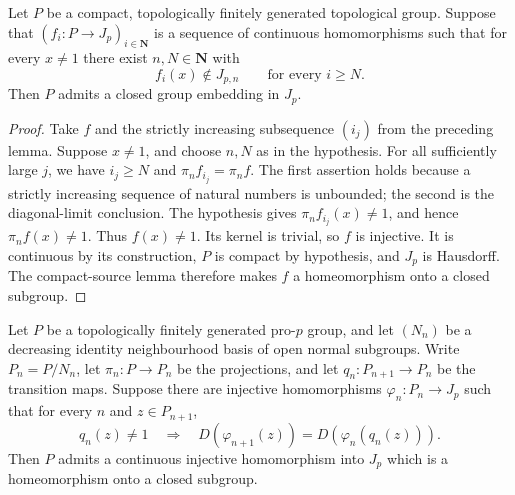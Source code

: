 \begin{lemma}
\label{lem:nottingham-depth-controlled-limit-embedding}
\leanok
Let $P$ be a compact, topologically finitely generated topological
group. Suppose that $(f_i:P\to J_p)_{i\in\mathbf N}$ is a sequence
of continuous homomorphisms such that for every $x\ne1$ there
exist $n,N\in\mathbf N$ with
\[
 f_i(x)\notin J_{p,n}\qquad\text{for every }i\ge N.
\]
Then $P$ admits a closed group embedding in $J_p$.
\end{lemma}

\begin{proof}
Take $f$ and the strictly increasing subsequence $(i_j)$ from
the preceding lemma. Suppose $x\ne1$, and choose $n,N$ as in
the hypothesis. For all sufficiently large $j$, we have
$i_j\ge N$ and $\pi_nf_{i_j}=\pi_nf$. The first assertion holds
because a strictly increasing sequence of natural numbers is
unbounded; the second is the diagonal-limit conclusion.
The hypothesis gives $\pi_nf_{i_j}(x)\ne1$, and hence
$\pi_nf(x)\ne1$. Thus $f(x)\ne1$. Its kernel is trivial, so
$f$ is injective. It is continuous by its construction, $P$ is
compact by hypothesis, and $J_p$ is Hausdorff. The compact-source
lemma therefore makes $f$ a homeomorphism onto a closed subgroup.
\end{proof}

\begin{lemma}
\label{lem:nottingham-embedding-of-quotient-depths}
\leanok
Let $P$ be a topologically finitely generated pro-$p$ group, and
let $(N_n)$ be a decreasing identity neighbourhood basis of open
normal subgroups. Write $P_n=P/N_n$, let $\pi_n:P\to P_n$ be
the projections, and let $q_n:P_{n+1}\to P_n$ be the transition maps.
Suppose there are injective homomorphisms $\varphi_n:P_n\to J_p$
such that for every $n$ and $z\in P_{n+1}$,
\[
 q_n(z)\ne1\quad\Longrightarrow\quad
 D(\varphi_{n+1}(z))=D(\varphi_n(q_n(z))).
\]
Then $P$ admits a continuous injective homomorphism into $J_p$
which is a homeomorphism onto a closed subgroup.
\end{lemma}


